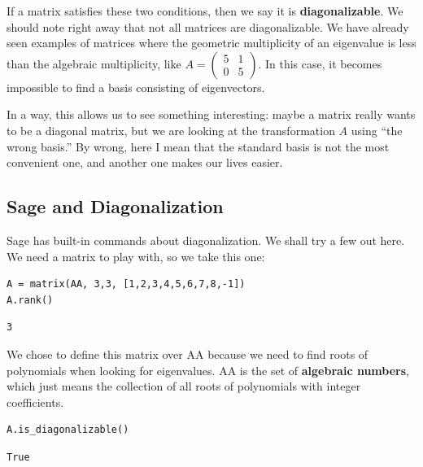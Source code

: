 \documentclass[10pt,]{book}
\newcommand{\terminology}[1]{\textbf{#1}}
\theoremstyle{plain}
\theoremstyle{definition}
\numberwithin{equation}{section}
\begin{document}
      If a matrix satisfies these two conditions, then we say it is
      \terminology{diagonalizable}. We should note right away that not all
      matrices are diagonalizable. We have already seen examples of matrices
      where the geometric multiplicity of an eigenvalue is less than the
      algebraic multiplicity, like
      \(A = \left( \begin{smallmatrix} 5 & 1 \\ 0 & 5 \end{smallmatrix}\right)\).
      In this case, it becomes impossible to find a basis consisting of eigenvectors.
\par

      In a way, this allows us to see something interesting: maybe a matrix
      really wants to be a diagonal matrix, but we are looking at the
      transformation \(A\) using ``the wrong basis.'' By wrong, here I
      mean that the standard basis is not the most convenient one, and another
      one makes our lives easier.
\typeout{************************************************}
\typeout{************************************************}
\subsection[Sage and Diagonalization]{Sage and Diagonalization}\label{subsection-132}

      Sage has built-in commands about diagonalization. We shall try a few out here.
      We need a matrix to play with, so we take this one:
\begin{lstlisting}[style=sageinput]
A = matrix(AA, 3,3, [1,2,3,4,5,6,7,8,-1])
A.rank()
\end{lstlisting}
\begin{lstlisting}[style=sageoutput]
3
\end{lstlisting}
\par

      We chose to define this matrix over AA because we need to find
      roots of polynomials when looking for eigenvalues. AA is the
      set of \terminology{algebraic numbers}, which just means the collection of
      all roots of polynomials with integer coefficients.
\begin{lstlisting}[style=sageinput]
A.is_diagonalizable()
\end{lstlisting}
\begin{lstlisting}[style=sageoutput]
True
\end{lstlisting}
\par
\end{document}
